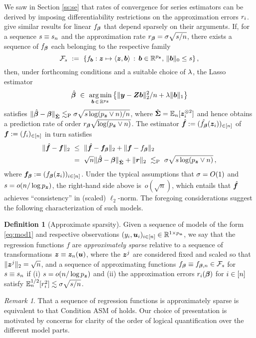 \documentclass{uwstat572}
\newcommand{\be}{\begin{equation}}
\newcommand{\ee}{\end{equation}}
\newcommand{\benn}{\begin{equation*}}
\newcommand{\eenn}{\end{equation*}}
\theoremstyle{definition}
\newtheorem{defi}[thm]{Definition}
\theoremstyle{remark}
\newtheorem{rek}[thm]{Remark}
\newcommand{\R}{\ensuremath{\mathbb{R}}}
\newcommand{\Prb}{\mathrm{P}}
\newcommand{\Ex}{\mathbb{E}}
\newcommand{\Exn}{\Ex_n}
\DeclareMathOperator*{\argmin}{arg\,min}
\newcommand{\bs}[1]{\boldsymbol{#1}}
\numberwithin{equation}{section}
\begin{document}
We saw in Section \ref{ss:se} that rates of convergence for series estimators can be derived by imposing differentiability restrictions on the approximation errors $\remi$. \cite{BCH11} give similar results for linear $\fb$ that depend sparsely on their arguments. If, for a sequence $\sb \equiv \sb_n$ and the approximation rate $\rb = \sd\sqrt{\sb/n}$, there exists a sequence of $\fb$ each belonging to the respective family
\benn%
	\fams \ := \ \{ f_{\bs{b}}: \z \mapsto \langle \z, \bs{b}\rangle \,:\, \bs{b} \in \R^{\pz},\, \|\bs{b}\|_0 \leq \sb \} \,,
\eenn
then, under forthcoming conditions and a suitable choice of $\tune$, the Lasso estimator
\be\label{def:lasso}
	\regbh \ \in \ \argmin_{\bs{b}\,\in\,\R^{\pz}} \big\{ \|\y - \Z\bs{b}\|_2^2/n + \tune\|\bs{b}\|_1 \big\}
\ee
satisfies $\|\regbh - \regb\|_{\gramhat} \lesssim_\Prb \sd\sqrt{s\log(\pz\vee n)/n}$, where $\gramhat = \Exn[\z_i^{\kpt}]$ and hence obtains a prediction rate of order $\rb\sqrt{\log(\pz\vee n)}$. The estimator $\fhat := (\fbhat(\z_i))_{\inn}$ of $\f := (f_i)_{\inn}$ in turn satisfies
\begin{align}
	\| \fhat -\f \|_2 \ & \leq \  \|\fhat - \ffb\|_2 + \| \f - \fb \|_2 \nonumber\\
	& = \ \sqrt{n}\|\regbh - \regb\|_{\gramhat} + \|\rem\|_2 \ \lesssim_\Prb \ \sd\sqrt{\sb\log(\pz\vee n)} \,,
\end{align}
where $\ffb := (\fb(\z_i))_{i\inn}$. Under the typical assumptions that $\sd = O(1)$ and $\sb = o(n/\log\pz)$, the right-hand side above is~$o(\sqrt{n})$, which entails that $\fhat$ achieves ``consistency'' in (scaled) $\ell_2$-norm. The foregoing considerations suggest the following characterization of such models.

\begin{defi}[Approximate sparsity]\label{def:as} Given a sequence of models of the form \eqref{eq:mod1} and respective observations $(y_i, \u_i)_{i\inn} \in \R^{1\times\pu}$, we say that the regression functions $f$ are \emph{approximately sparse} relative to a sequence of transformations $\z \equiv \z_n(\u)$, where the $\z^j$ are considered fixed and scaled so that $\|\z^j\|_2 = \sqrt{n}$, and a sequence of approximating functions $\fb \equiv \fbn \in \fams$ for $\sb \equiv \sb_n$ if (i) $\sb = o(n/\log\pz)$ and (ii) the approximation errors $\remi(\regb)$ for $i\inn$ satisfy $\Exn^{1/2}[\remi^2] \lesssim \sd\sqrt{\sb/n}$.
\end{defi}

\begin{rek} That a sequence of regression functions is approximately sparse is equivalent to that Condition ASM of \cite{BCH11} holds. Our choice of presentation is motivated by concerns for clarity of the order of logical quantification over the different model parts. 
\end{rek}
\end{document}
